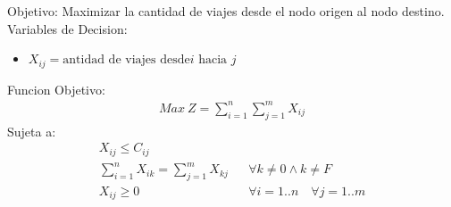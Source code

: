 \begin{homeworkProblem}
Objetivo: Maximizar la cantidad de viajes desde el nodo origen al nodo destino.
Variables de Decision:
\begin{itemize}
    \item $
        X_{ij} = \text{antidad de viajes desde} i \text{ hacia } j
    $\end{itemize}
Funcion Objetivo:
\begin{align*}
    Max\ Z = \sum_{i=1}^{n}{\sum_{j=1}^{m}{X_{ij}}}
\end{align*}
Sujeta a:
\begin{align*}
    &X_{ij} \leq C_{ij}& &&\\
    &\sum_{i=1}^{n}{X_{ik}} = \sum_{j=1}^{m}{X_{kj}}& &\forall k\ne 0 \wedge k\ne F& \\
    &X_{ij} \geq 0& &\forall i=1..n \quad \forall j=1..m&
\end{align*}
\end{homeworkProblem}